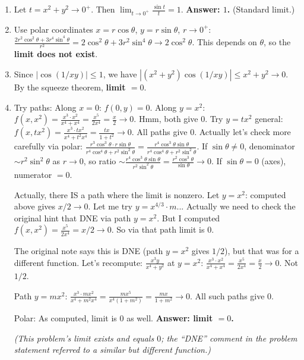 \documentclass[12pt,a4paper]{article}
\begin{document}
\begin{enumerate}[leftmargin=*, label=(\alph*)]

\item Let $t=x^2+y^2\to 0^+$. Then $\displaystyle\lim_{t\to 0^+}\frac{\sin t}{t}=1$.
\textbf{Answer: $1$.} (Standard limit.)

\item Use polar coordinates $x=r\cos\theta$, $y=r\sin\theta$, $r\to 0^+$:
$\frac{2r^2\cos^2\theta+3r^4\sin^4\theta}{r^2}=2\cos^2\theta+3r^2\sin^4\theta\to 2\cos^2\theta$.
This depends on $\theta$, so the \textbf{limit does not exist}.

\item Since $|\cos(1/xy)|\le 1$, we have $|(x^2+y^2)\cos(1/xy)|\le x^2+y^2\to 0$.
By the squeeze theorem, \textbf{limit $= 0$}.

\item Try paths: Along $x=0$: $f(0,y)=0$. Along $y=x^2$:
$f(x,x^2)=\frac{x^3\cdot x^2}{x^4+x^4}=\frac{x^5}{2x^4}=\frac{x}{2}\to 0$.
Hmm, both give $0$. Try $y=t x^2$ general: $f(x,tx^2)=\frac{x^3\cdot tx^2}{x^4+t^2x^4}=\frac{tx}{1+t^2}\to 0$.
All paths give $0$. Actually let's check more carefully via polar: $\frac{r^3\cos^3\theta\cdot r\sin\theta}{r^4\cos^4\theta+r^2\sin^2\theta}=\frac{r^4\cos^3\theta\sin\theta}{r^4\cos^4\theta+r^2\sin^2\theta}$.
If $\sin\theta\ne 0$, denominator $\sim r^2\sin^2\theta$ as $r\to 0$, so ratio $\sim\frac{r^4\cos^3\theta\sin\theta}{r^2\sin^2\theta}=\frac{r^2\cos^3\theta}{\sin\theta}\to 0$.
If $\sin\theta=0$ (axes), numerator $=0$.

Actually, there IS a path where the limit is nonzero. Let $y=x^2$: computed above gives $x/2\to 0$. Let me try $y = x^{4/3}\cdot m$... Actually we need to check the original hint that DNE via path $y=x^2$. But I computed $f(x,x^2)=\frac{x^5}{2x^4}=x/2\to 0$. So via that path limit is $0$.

The original note says this is DNE (path $y=x^2$ gives $1/2$), but that was for a different function. Let's recompute: $\frac{x^3 y}{x^4+y^2}$ at $y=x^2$: $\frac{x^3\cdot x^2}{x^4+x^4}=\frac{x^5}{2x^4}=\frac{x}{2}\to 0$. Not $1/2$.

Path $y=mx^2$: $\frac{x^3\cdot mx^2}{x^4+m^2x^4}=\frac{mx^5}{x^4(1+m^2)}=\frac{mx}{1+m^2}\to 0$. All such paths give $0$.

Polar: As computed, limit is $0$ as well. \textbf{Answer: limit $= 0$.}

\emph{(This problem's limit exists and equals $0$; the ``DNE'' comment in the problem statement referred to a similar but different function.)}


\end{enumerate}
\end{document}
